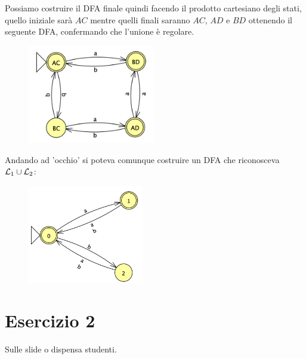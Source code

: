 \documentclass[11pt]{article}
\begin{document}
\begin{tcolorbox}[colframe=orange!70!black, colback=orange!10!white, title=\textbf{\textit{Nota inutile ai fini dell'esercizio:}}]
Possiamo costruire il DFA finale quindi facendo il prodotto cartesiano
degli stati, quello iniziale sarà $AC$ mentre quelli finali saranno 
$AC$, $AD$ e $BD$ ottenendo il seguente DFA, confermando che l'unione 
è regolare.
\begin{figure}[H]
  \centering
  \includegraphics[height=4.3cm]{img/01Unione.png}
  \label{fig:01-DFA-unione}
\end{figure}
\noindent Andando ad 'occhio' si poteva comunque costruire un DFA 
che riconosceva ${\cal L}_1 \cup {\cal L}_2$:
\begin{figure}[H]
  \centering
  \includegraphics[height=4.3cm]{img/01Unione-1.png}
  \label{fig:01-DFA-unione-1}
\end{figure} 
\end{tcolorbox}
\section*{Esercizio 2}
Sulle slide o dispensa studenti.
\newpage
\end{document}
